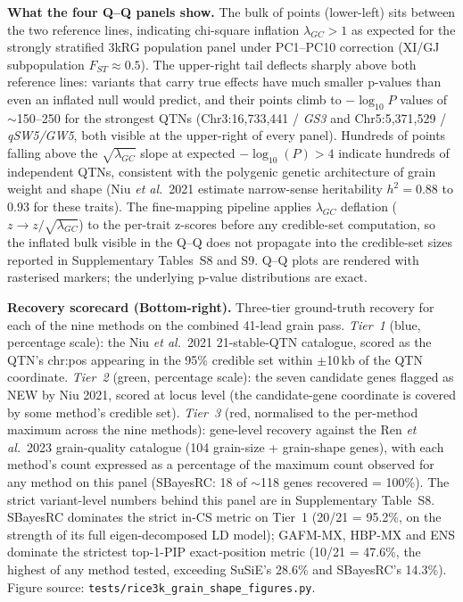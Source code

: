 \noindent\textbf{What the four Q--Q panels show.}\hspace{1ex}%
The bulk of points (lower-left) sits between the two reference lines,
indicating chi-square inflation $\lambda_{GC} > 1$ as expected for the
strongly stratified 3kRG population panel under PC1--PC10 correction
(XI/GJ subpopulation $F_{ST} \approx 0.5$). The upper-right tail
deflects sharply above both reference lines: variants that carry
true effects have much smaller p-values than even an inflated null
would predict, and their points climb to $-\log_{10}\!P$ values of
$\sim$150--250 for the strongest QTNs
(Chr3:16{,}733{,}441 / \emph{GS3} and
Chr5:5{,}371{,}529 / \emph{qSW5/GW5}, both visible at the upper-right
of every panel). Hundreds of points falling above the
$\sqrt{\lambda_{GC}}$ slope at expected $-\log_{10}(P) > 4$ indicate
hundreds of independent QTNs, consistent with the polygenic genetic
architecture of grain weight and shape (Niu \emph{et al.}\ 2021
\cite{niu2021grain} estimate narrow-sense heritability $h^2 = 0.88$
to $0.93$ for these traits). The fine-mapping pipeline applies
$\lambda_{GC}$ deflation ($z \to z / \sqrt{\lambda_{GC}}$) to the
per-trait z-scores before any credible-set computation, so the
inflated bulk visible in the Q--Q does not propagate into the
credible-set sizes reported in Supplementary Tables~S8 and S9.
Q--Q plots are rendered with rasterised markers; the underlying
p-value distributions are exact.

\noindent\textbf{Recovery scorecard (Bottom-right).}\hspace{1ex}%
Three-tier ground-truth recovery for each of the nine methods on the
combined 41-lead grain pass.
\emph{Tier~1} (blue, percentage scale): the Niu \emph{et al.}\ 2021
21-stable-QTN catalogue, scored as the QTN's chr:pos appearing in the
95\% credible set within $\pm$10\,kb of the QTN coordinate.
\emph{Tier~2} (green, percentage scale): the seven candidate genes
flagged as NEW by Niu 2021, scored at locus level (the candidate-gene
coordinate is covered by some method's credible set).
\emph{Tier~3} (red, normalised to the per-method maximum across the
nine methods): gene-level recovery against the Ren \emph{et al.}\ 2023
\cite{ren2023rice} grain-quality catalogue (104 grain-size +
grain-shape genes), with each method's count expressed as a percentage
of the maximum count observed for any method on this panel
(SBayesRC: 18 of $\sim$118 genes recovered = 100\%).
The strict variant-level numbers behind this panel are in
Supplementary Table~S8.
SBayesRC dominates the strict in-CS metric on Tier~1 (20/21 = 95.2\%,
on the strength of its full eigen-decomposed LD model); GAFM-MX,
HBP-MX and ENS dominate the strictest top-1-PIP exact-position
metric (10/21 = 47.6\%, the highest of any method tested,
exceeding SuSiE's 28.6\% and SBayesRC's 14.3\%).
Figure source: \texttt{tests/rice3k\_grain\_shape\_figures.py}.

